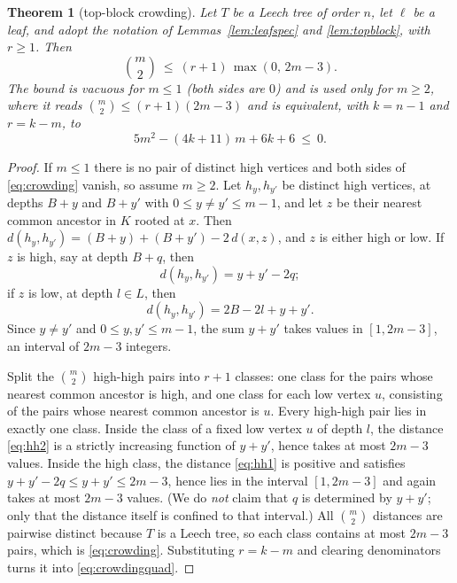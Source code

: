 \documentclass[11pt,a4paper]{article}
\theoremstyle{plain}
\newtheorem{theorem}{Theorem}[section]
\theoremstyle{remark}
\newcommand{\bin}[2]{\binom{#1}{#2}}
\begin{document}
\begin{theorem}[top-block crowding]\label{thm:crowding}
Let $T$ be a Leech tree of order $n$, let $\ell$ be a leaf, and adopt the
notation of Lemmas~\ref{lem:leafspec} and \ref{lem:topblock}, with $r\ge1$.
Then
\begin{equation}\label{eq:crowding}
  \bin m2\ \le\ (r+1)\,\max(0,\,2m-3).
\end{equation}
The bound is vacuous for $m\le1$ (both sides are $0$) and is used only for
$m\ge2$, where it reads $\bin m2\le(r+1)(2m-3)$ and is equivalent, with
$k=n-1$ and $r=k-m$, to
\begin{equation}\label{eq:crowdingquad}
  5m^2-(4k+11)\,m+6k+6\ \le\ 0 .
\end{equation}
\end{theorem}

\begin{proof}
If $m\le1$ there is no pair of distinct high vertices and both sides of
\eqref{eq:crowding} vanish, so assume $m\ge2$.
Let $h_y,h_{y'}$ be distinct high vertices, at depths $B+y$ and $B+y'$ with
$0\le y\ne y'\le m-1$, and let $z$ be their nearest common ancestor in $K$
rooted at $x$.  Then
$d(h_y,h_{y'})=(B+y)+(B+y')-2\,d(x,z)$, and $z$ is either high or low.  If $z$
is high, say at depth $B+q$, then
\begin{equation}\label{eq:hh1}
  d(h_y,h_{y'})=y+y'-2q ;
\end{equation}
if $z$ is low, at depth $l\in L$, then
\begin{equation}\label{eq:hh2}
  d(h_y,h_{y'})=2B-2l+y+y' .
\end{equation}
Since $y\ne y'$ and $0\le y,y'\le m-1$, the sum $y+y'$ takes
values in $[1,2m-3]$, an interval of $2m-3$ integers.

Split the $\bin m2$ high-high pairs into $r+1$ classes: one class for the pairs
whose nearest common ancestor is high, and one class for each low vertex $u$,
consisting of the pairs whose nearest common ancestor is $u$.  Every high-high
pair lies in exactly one class.  Inside the class of a fixed low vertex $u$ of
depth $l$, the distance \eqref{eq:hh2} is a strictly increasing function of
$y+y'$, hence takes at most $2m-3$ values.  Inside the high class, the distance
\eqref{eq:hh1} is positive and satisfies $y+y'-2q\le y+y'\le 2m-3$, hence lies
in the interval $[1,2m-3]$ and again takes at most $2m-3$ values.  (We do
\emph{not} claim that $q$ is determined by $y+y'$; only that the distance itself
is confined to that interval.)  All $\bin m2$ distances are pairwise distinct
because $T$ is a Leech tree, so each class contains at most $2m-3$ pairs, which
is \eqref{eq:crowding}.  Substituting $r=k-m$ and clearing denominators turns
it into \eqref{eq:crowdingquad}.
\end{proof}
\end{document}
